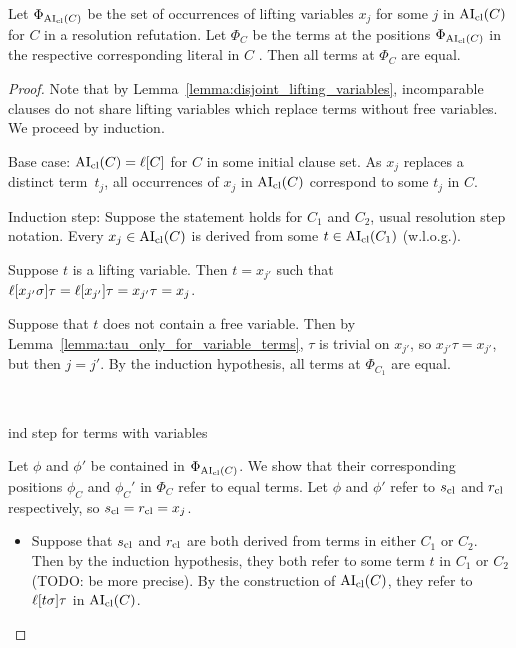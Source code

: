 \documentclass[,%
	paper=a4,%
	DIV14, 
	liststotoc,
	bibtotoc,
	draft=false,%
	numbers=noendperiod
]{scrartcl}
\begin{document}
\begin{lemma}
	Let $\Phi_{\operatorname{AI}_\mathrm{cl}(C)}$ be the set of occurrences of lifting variables $x_j$ for some $j$ in $\operatorname{AI}_\mathrm{cl}(C)$ for $C$ in a resolution refutation.
	Let $\Phi_{C}$ be the terms at the positions $\Phi_{\operatorname{AI}_\mathrm{cl}(C)}$ in the respective corresponding literal in $C$ .
	Then all terms at $\Phi_C$ are equal.
\end{lemma}
\begin{proof}
	Note that by Lemma~\ref{lemma:disjoint_lifting_variables}, incomparable clauses do not share lifting variables which replace terms without free variables. 
	We proceed by induction.

	Base case: $\operatorname{AI}_\mathrm{cl}(C) = \ell[C]$ for $C$ in some initial clause set.
	As $x_j$ replaces a distinct term~$t_j$, all occurrences of $x_j$ in $\operatorname{AI}_\mathrm{cl}(C)$ correspond to some $t_j$ in $C$.

	Induction step:
	Suppose the statement holds for $C_1$ and $C_2$, usual resolution step notation.
	Every $x_j \in \operatorname{AI}_\mathrm{cl}(C)$ is derived from some $t \in \operatorname{AI}_\mathrm{cl}(C_1)$ (w.l.o.g.).
	\begin{compactitem}
	\item
		Suppose $t$ is a lifting variable.
		Then $t = x_{j'}$ such that $\lifboth{x_{j'}\sigma}\tau = \lifboth{x_{j'}}\tau = x_{j'}\tau =\nolinebreak x_j$.

		Suppose that $t$ does not contain a free variable.
		Then by Lemma~\ref{lemma:tau_only_for_variable_terms}, $\tau$ is trivial on $x_{j'}$, so $x_{j'}\tau = x_{j'}$, but then $j=j'$.
		By the induction hypothesis, all terms at $\Phi_{C_1}$ are equal.
	\end{compactitem}

	\bigskip

	~
	\bigskip

	ind step for terms with variables


	Let $\phi$ and $\phi'$ be contained in $\Phi_{\operatorname{AI}_\mathrm{cl}(C)}$. We show that their corresponding positions $\phi_C$ and $\phi_C'$ in $\Phi_C$ refer to equal terms.
	Let $\phi$ and $\phi'$ refer to $s_\mathrm{cl}$ and $r_\mathrm{cl}$ respectively, so $s_\mathrm{cl} = r_\mathrm{cl} = x_j$.
	\begin{itemize}
		\item Suppose that $s_\mathrm{cl}$ and $r_\mathrm{cl}$ are both derived from terms in either $C_1$ or $C_2$.
			Then by the induction hypothesis, they both refer to some term $t$ in $C_1$ or $C_2$ (TODO: be more precise).
			By the construction of $\operatorname{AI}_\mathrm{cl}(C)$, they refer to $\ell[t\sigma]\tau$ in $\operatorname{AI}_\mathrm{cl}(C)$.


\end{itemize}
\end{proof}
\end{document}
